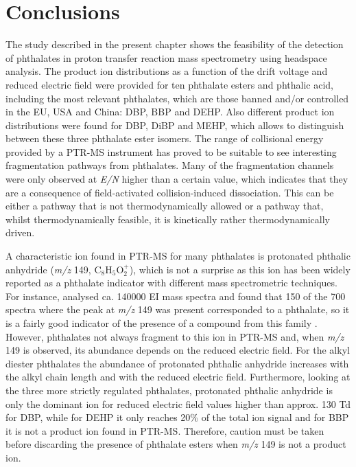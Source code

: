 \section{Conclusions}
The study described in the present chapter shows the feasibility of the detection of phthalates in proton transfer reaction mass spectrometry using headspace analysis. 
%
The product ion distributions as a function of the drift voltage and reduced electric field were provided for ten phthalate esters and phthalic acid, including the most relevant phthalates, which are those banned and/or controlled in the EU, USA and China: DBP, BBP and DEHP.
%
Also different product ion distributions were found for  DBP, DiBP and MEHP, which allows to distinguish between these three phthalate ester isomers.
%
The range of collisional energy provided by a PTR-MS instrument has proved to be suitable to see interesting fragmentation pathways from phthalates.
%
Many of the fragmentation channels were only observed at \textit{E/N} higher than a certain value, which indicates that they are a consequence of field-activated collision-induced dissociation.
%
This can be either a pathway that is not thermodynamically allowed or a pathway that, whilst thermodynamically feasible, it is kinetically rather thermodynamically driven.


A characteristic ion found in PTR-MS for many phthalates is protonated phthalic anhydride (\textit{m/z} 149, C$_8$H$_5$O$_2^+$), which is not a surprise as this ion has been widely reported as a phthalate indicator with different mass spectrometric techniques. 
For instance, \citeauthor{mclafferty1989registry} analysed  ca. 140000  EI mass spectra and found that 150 of the 700 spectra where the peak at \textit{m/z} 149  was present corresponded to a phthalate,  so it is a fairly good indicator of the presence of a compound from this family \cite{mclafferty1993interpretation,mclafferty1989registry}. 
%
However, phthalates not always fragment to this ion in PTR-MS and, when \textit{m/z} 149 is observed, its abundance depends on  the reduced electric field. For the alkyl diester phthalates the abundance of protonated phthalic anhydride  increases with the alkyl chain length and with the reduced electric field.
%
Furthermore, looking at the three more strictly regulated phthalates, protonated phthalic anhydride is only the dominant ion for reduced electric field values higher than approx. 130 Td for DBP, while for DEHP it  only reaches  20\% of the total ion signal and for BBP it is not a product ion found in PTR-MS.
%
Therefore, %
caution must be taken before discarding the presence of phthalate esters when \textit{m/z} 149 is not a product ion.





